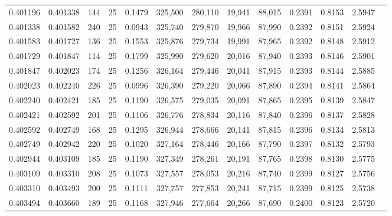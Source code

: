 \begin{tabular}{rrrrrrrrrrrrr}
0.401196 & 0.401338 &   144 &  25 &                                     0.1479 & 325,500 & 280,110 &  19,941 &  88,015 & 0.2391 & 0.8153 & 2.5947 \\
0.401338 & 0.401582 &   240 &  25 &                                     0.0943 & 325,740 & 279,870 &  19,966 &  87,990 & 0.2392 & 0.8151 & 2.5924 \\
0.401583 & 0.401727 &   136 &  25 &                                     0.1553 & 325,876 & 279,734 &  19,991 &  87,965 & 0.2392 & 0.8148 & 2.5912 \\
0.401729 & 0.401847 &   114 &  25 &                                     0.1799 & 325,990 & 279,620 &  20,016 &  87,940 & 0.2393 & 0.8146 & 2.5901 \\
0.401847 & 0.402023 &   174 &  25 &                                     0.1256 & 326,164 & 279,446 &  20,041 &  87,915 & 0.2393 & 0.8144 & 2.5885 \\
0.402023 & 0.402240 &   226 &  25 &                                     0.0996 & 326,390 & 279,220 &  20,066 &  87,890 & 0.2394 & 0.8141 & 2.5864 \\
0.402240 & 0.402421 &   185 &  25 &                                     0.1190 & 326,575 & 279,035 &  20,091 &  87,865 & 0.2395 & 0.8139 & 2.5847 \\
0.402421 & 0.402592 &   201 &  25 &                                     0.1106 & 326,776 & 278,834 &  20,116 &  87,840 & 0.2396 & 0.8137 & 2.5828 \\
0.402592 & 0.402749 &   168 &  25 &                                     0.1295 & 326,944 & 278,666 &  20,141 &  87,815 & 0.2396 & 0.8134 & 2.5813 \\
0.402749 & 0.402942 &   220 &  25 &                                     0.1020 & 327,164 & 278,446 &  20,166 &  87,790 & 0.2397 & 0.8132 & 2.5793 \\
0.402944 & 0.403109 &   185 &  25 &                                     0.1190 & 327,349 & 278,261 &  20,191 &  87,765 & 0.2398 & 0.8130 & 2.5775 \\
0.403109 & 0.403310 &   208 &  25 &                                     0.1073 & 327,557 & 278,053 &  20,216 &  87,740 & 0.2399 & 0.8127 & 2.5756 \\
0.403310 & 0.403493 &   200 &  25 &                                     0.1111 & 327,757 & 277,853 &  20,241 &  87,715 & 0.2399 & 0.8125 & 2.5738 \\
0.403494 & 0.403660 &   189 &  25 &                                     0.1168 & 327,946 & 277,664 &  20,266 &  87,690 & 0.2400 & 0.8123 & 2.5720 \\

\end{tabular}
